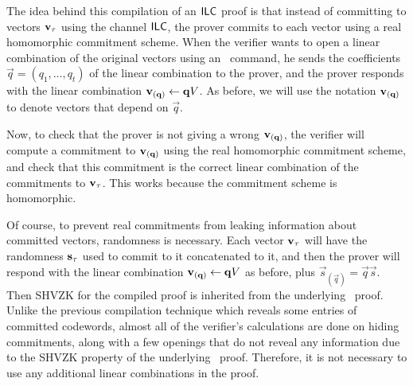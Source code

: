 The idea behind this compilation of an $\mathsf{ILC}$ proof is that instead of committing to vectors ${\mathbf{v}}_\tau$ using the channel $\mathsf{ILC}$, the prover commits to each vector using a real homomorphic commitment scheme. When the verifier wants to open a linear combination of the original vectors using an \ILCopen\ command, he sends the coefficients $\vec{q}=(q_1,\ldots,q_t)$ of the linear combination to the prover, and the prover responds with the linear combination ${\mathbf{v}}_{(\mathbf{q})}\gets \mathbf{q} V$.
As before, we will use the notation ${\mathbf{v}}_{(\mathbf{q})}$ to denote vectors that depend on $\vec{q}$.

Now, to check that the prover is not giving a wrong ${\mathbf{v}}_{(\mathbf{q})}$, the verifier will compute a commitment to ${\mathbf{v}}_{(\mathbf{q})}$ using the real homomorphic commitment scheme, and check that this commitment is the correct linear combination of the commitments to ${\mathbf{v}}_\tau$. This works because the commitment scheme is homomorphic.

Of course, to prevent real commitments from leaking information about committed vectors, randomness is necessary. Each vector ${\mathbf{v}}_\tau$ will have the randomness $\mathbf{s}_\tau$ used to commit to it concatenated to it, and then the prover will respond with the linear combination ${\mathbf{v}}_{(\mathbf{q})}\gets \mathbf{q} V$ as before, plus $\vec{s}_{(\vec{q})}=\vec{q}\vec{s}$. Then SHVZK for the compiled proof is inherited from the underlying \ILC\ proof. Unlike the previous compilation technique which reveals some entries of committed codewords, almost all of the verifier's calculations are done on hiding commitments, along with a few openings that do not reveal any information due to the SHVZK property of the underlying \ILC\ proof. Therefore, it is not necessary to use any additional linear combinations in the proof.

